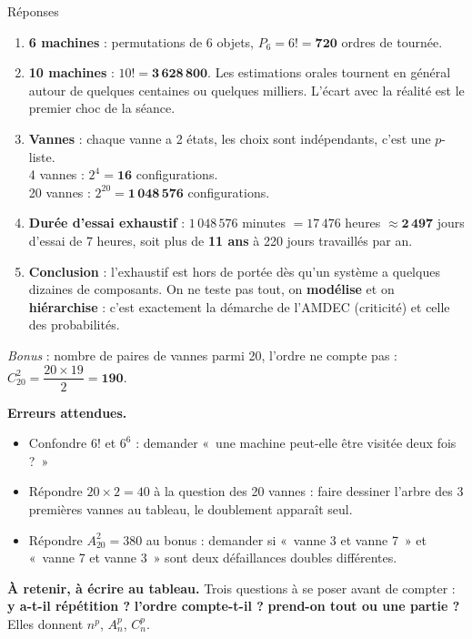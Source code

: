 \documentclass[a4paper,11pt]{article}
\begin{document}
\begin{exo}{Réponses}
\begin{enumerate}
  \item \textbf{6 machines} : permutations de 6 objets, $P_6 = 6! = \mathbf{720}$ ordres de tournée.
  \item \textbf{10 machines} : $10! = \mathbf{3\,628\,800}$. Les estimations orales tournent en général autour de quelques centaines ou quelques milliers. L'écart avec la réalité est le premier choc de la séance.
  \item \textbf{Vannes} : chaque vanne a 2 états, les choix sont indépendants, c'est une $p$-liste. \\
  4 vannes : $2^4 = \mathbf{16}$ configurations. \\
  20 vannes : $2^{20} = \mathbf{1\,048\,576}$ configurations.
  \item \textbf{Durée d'essai exhaustif} : $1\,048\,576$ minutes $= 17\,476$ heures $\approx \mathbf{2\,497}$ jours d'essai de 7 heures, soit plus de \textbf{11 ans} à 220 jours travaillés par an.
  \item \textbf{Conclusion} : l'exhaustif est hors de portée dès qu'un système a quelques dizaines de composants. On ne teste pas tout, on \textbf{modélise} et on \textbf{hiérarchise} : c'est exactement la démarche de l'AMDEC (criticité) et celle des probabilités.
\end{enumerate}

\textit{Bonus} : nombre de paires de vannes parmi 20, l'ordre ne compte pas : $C_{20}^{2} = \dfrac{20 \times 19}{2} = \mathbf{190}$.
\end{exo}

\begin{piege}
\textbf{Erreurs attendues.}
\begin{itemize}
  \item Confondre $6!$ et $6^6$ : demander «~une machine peut-elle être visitée deux fois ?~»
  \item Répondre $20 \times 2 = 40$ à la question des 20 vannes : faire dessiner l'arbre des 3 premières vannes au tableau, le doublement apparaît seul.
  \item Répondre $A_{20}^{2} = 380$ au bonus : demander si «~vanne 3 et vanne 7~» et «~vanne 7 et vanne 3~» sont deux défaillances doubles différentes.
\end{itemize}
\end{piege}

\begin{cle}
\textbf{À retenir, à écrire au tableau.} Trois questions à se poser avant de compter : \textbf{y a-t-il répétition ?} \textbf{l'ordre compte-t-il ?} \textbf{prend-on tout ou une partie ?} Elles donnent $n^p$, $A_n^p$, $C_n^p$.
\end{cle}
\end{document}
